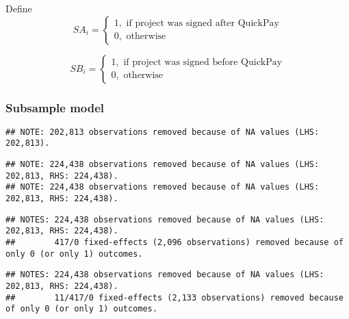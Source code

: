 \documentclass[
]{article}
\begin{document}
Define
\[ SA_i = \begin{cases} 1, \text{ if project was signed after QuickPay}\\
0, \text{ otherwise} \end{cases}\]

\[ SB_i = \begin{cases} 1, \text{ if project was signed before QuickPay}\\
0, \text{ otherwise} \end{cases}\]

\hypertarget{subsample-model}{%
\subsubsection{Subsample model}\label{subsample-model}}

\begin{verbatim}
## NOTE: 202,813 observations removed because of NA values (LHS: 202,813).
\end{verbatim}

\begin{verbatim}
## NOTE: 224,438 observations removed because of NA values (LHS: 202,813, RHS: 224,438).
## NOTE: 224,438 observations removed because of NA values (LHS: 202,813, RHS: 224,438).
\end{verbatim}

\begin{verbatim}
## NOTES: 224,438 observations removed because of NA values (LHS: 202,813, RHS: 224,438).
##        417/0 fixed-effects (2,096 observations) removed because of only 0 (or only 1) outcomes.
\end{verbatim}

\begin{verbatim}
## NOTES: 224,438 observations removed because of NA values (LHS: 202,813, RHS: 224,438).
##        11/417/0 fixed-effects (2,133 observations) removed because of only 0 (or only 1) outcomes.
\end{verbatim}
\end{document}
